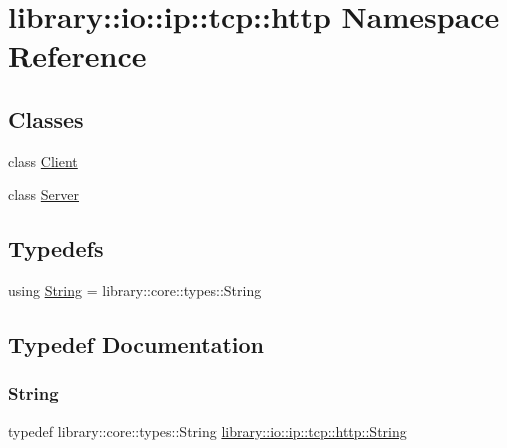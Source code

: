 \hypertarget{namespacelibrary_1_1io_1_1ip_1_1tcp_1_1http}{}\section{library\+:\+:io\+:\+:ip\+:\+:tcp\+:\+:http Namespace Reference}
\label{namespacelibrary_1_1io_1_1ip_1_1tcp_1_1http}
\subsection*{Classes}
\begin{DoxyCompactItemize}
\item 
class \hyperlink{classlibrary_1_1io_1_1ip_1_1tcp_1_1http_1_1_client}{Client}
\item 
class \hyperlink{classlibrary_1_1io_1_1ip_1_1tcp_1_1http_1_1_server}{Server}
\end{DoxyCompactItemize}
\subsection*{Typedefs}
\begin{DoxyCompactItemize}
\item 
using \hyperlink{namespacelibrary_1_1io_1_1ip_1_1tcp_1_1http_a5b31739ff421d6a655a5f2c7cc3a4c39}{String} = library\+::core\+::types\+::\+String
\end{DoxyCompactItemize}


\subsection{Typedef Documentation}
\mbox{\label{namespacelibrary_1_1io_1_1ip_1_1tcp_1_1http_a5b31739ff421d6a655a5f2c7cc3a4c39}} 
\subsubsection{\texorpdfstring{String}{String}}
{\footnotesize\ttfamily typedef library\+::core\+::types\+::\+String \hyperlink{namespacelibrary_1_1io_1_1ip_1_1tcp_1_1http_a5b31739ff421d6a655a5f2c7cc3a4c39}{library\+::io\+::ip\+::tcp\+::http\+::\+String}}

